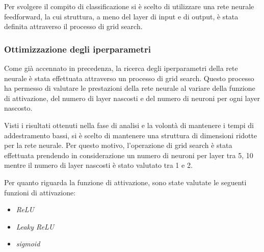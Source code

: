 Per svolgere il compito di classificazione si è scelto di utilizzare una rete
neurale feedforward, la cui struttura, a meno del layer di input e di output, è
stata definita attraverso il processo di grid search.
\subsubsection{Ottimizzazione degli iperparametri}
Come già accennato in precedenza, la ricerca degli iperparametri della rete neurale
è stata effettuata attraverso un processo di grid search. Questo processo ha
permesso di valutare le prestazioni della rete neurale al variare della funzione
di attivazione, del numero di layer nascosti e del numero di neuroni per ogni
layer nascosto.

Visti i risultati ottenuti nella fase di analisi e la volontà di mantenere i
tempi di addestramento bassi, si è scelto di mantenere una struttura di dimensioni
ridotte per la rete neurale. Per questo motivo, l'operazione di grid search è
stata effettuata prendendo in considerazione un numero di neuroni per layer
tra 5, 10 mentre il numero di layer nascosti è stato valutato tra 1 e 2.

Per quanto riguarda la funzione di attivazione, sono state valutate le seguenti
funzioni di attivazione:
\begin{itemize}
    \item \textit{ReLU}
    \item \textit{Leaky ReLU}
    \item \textit{sigmoid}
\end{itemize}

